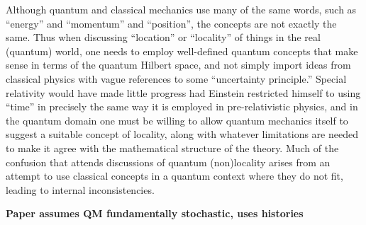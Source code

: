 \documentclass[12pt]{article} %
\def\outl#1{\par{\medskip\noindent\hspace*{.5cm}\bf
      \mathversion{bold}#1\mathversion{normal}\smallskip} }
\def\np{} \def\xa{} \def\xb{} \def\xn{} \def\xp{}
\def\outl#1{} \def\np{} \def\xa{} \def\xb{} \def\xn{} \def\xp{}
\def\outl#1{\par{\medskip\noindent\hspace*{.5cm}\bf
      \mathversion{bold}#1\mathversion{normal}\smallskip} }
\def\np{\newpage }\def\xn{\nopagebreak }\def\xp{\pagebreak }
\begin{document}
Although quantum and classical mechanics use many of the same words, such as
``energy'' and ``momentum'' and ``position'', the concepts are not exactly the
same.  Thus when discussing ``location'' or ``locality'' of things in the real
(quantum) world, one needs to employ well-defined quantum concepts that make
sense in terms of the quantum Hilbert space, and not simply import ideas from
classical physics with vague references to some ``uncertainty principle.''
Special relativity would have made little progress had Einstein restricted
himself to using ``time'' in precisely the same way it is employed in
pre-relativistic physics, and in the quantum domain one must be willing to
allow quantum mechanics itself to suggest a suitable concept of locality,
along with whatever limitations are needed to make it agree with the
mathematical structure of the theory.  Much of the confusion that attends
discussions of quantum (non)locality arises from an attempt to use classical
concepts in a quantum context where they do not fit, leading to internal
inconsistencies.

\xb
\outl{Paper assumes QM fundamentally stochastic, uses histories}
\xa
\end{document}
